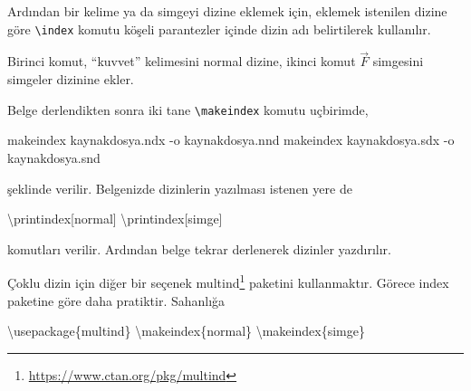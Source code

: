 \documentclass[
  10pt,
]{scrbook}
\newenvironment{Shaded}{\begin{snugshade}}{\end{snugshade}}
\newcommand{\BuiltInTok}[1]{#1}
\newcommand{\ExtensionTok}[1]{#1}
\newcommand{\FunctionTok}[1]{\textcolor[rgb]{0.00,0.00,0.00}{#1}}
\newcommand{\NormalTok}[1]{#1}
\newcommand{\SpecialCharTok}[1]{\textcolor[rgb]{0.00,0.00,0.00}{#1}}
\newcommand{\SpecialStringTok}[1]{\textcolor[rgb]{0.31,0.60,0.02}{#1}}
\renewcommand{\href}[2]{#2\footnote{\url{#1}}}
\theoremstyle{definition}
\theoremstyle{definition}
\theoremstyle{definition}
\theoremstyle{definition}
\theoremstyle{remark}
\begin{document}
Ardından bir kelime ya da simgeyi dizine eklemek için, eklemek istenilen dizine göre \texttt{\textbackslash{}index} komutu köşeli parantezler içinde dizin adı belirtilerek kullanılır.

\begin{Shaded}
\end{Shaded}

Birinci komut, ``kuvvet'' kelimesini normal dizine, ikinci komut \(\vec{F}\) simgesini simgeler dizinine ekler.

Belge derlendikten sonra iki tane \texttt{\textbackslash{}makeindex} komutu uçbirimde,

\begin{Shaded}
\begin{Highlighting}[]
\NormalTok{makeindex kaynakdosya.ndx {-}o kaynakdosya.nnd }
\NormalTok{makeindex kaynakdosya.sdx {-}o kaynakdosya.snd }
\end{Highlighting}
\end{Shaded}

şeklinde verilir. Belgenizde dizinlerin yazılması istenen yere de

\begin{Shaded}
\begin{Highlighting}[]
\FunctionTok{\textbackslash{}printindex}\NormalTok{[normal]}
\FunctionTok{\textbackslash{}printindex}\NormalTok{[simge]}
\end{Highlighting}
\end{Shaded}

komutları verilir. Ardından belge tekrar derlenerek dizinler yazdırılır.

Çoklu dizin için diğer bir seçenek \href{https://www.ctan.org/pkg/multind}{multind} paketini kullanmaktır. Görece index paketine göre daha pratiktir. Sahanlığa

\begin{Shaded}
\begin{Highlighting}[]
\BuiltInTok{\textbackslash{}usepackage}\NormalTok{\{}\ExtensionTok{multind}\NormalTok{\}}
\FunctionTok{\textbackslash{}makeindex}\NormalTok{\{normal\}}
\FunctionTok{\textbackslash{}makeindex}\NormalTok{\{simge\}}
\end{Highlighting}
\end{Shaded}
\end{document}
